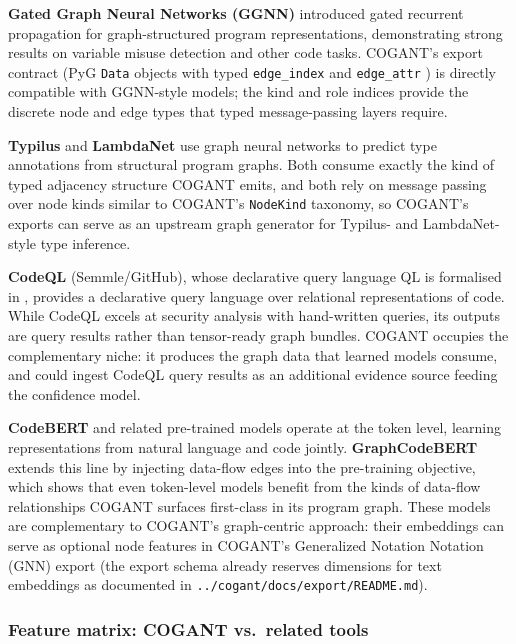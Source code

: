 \documentclass[
]{article}
\begin{document}
\textbf{Gated Graph Neural Networks (GGNN)} \citep{li2016gated}
introduced gated recurrent propagation for graph-structured program
representations, demonstrating strong results on variable misuse
detection and other code tasks. COGANT's export contract (PyG
\texttt{Data} objects with typed \texttt{edge\_index} and
\texttt{edge\_attr} \citep{fey2019pyg}) is directly compatible with
GGNN-style models; the kind and role indices provide the discrete node
and edge types that typed message-passing layers require.

\textbf{Typilus} \citep{allamanis2020typilus} and \textbf{LambdaNet}
\citep{wei2020lambdanet} use graph neural networks to predict type
annotations from structural program graphs. Both consume exactly the
kind of typed adjacency structure COGANT emits, and both rely on message
passing over node kinds similar to COGANT's \texttt{NodeKind} taxonomy,
so COGANT's exports can serve as an upstream graph generator for
Typilus- and LambdaNet-style type inference.

\textbf{CodeQL} (Semmle/GitHub), whose declarative query language QL is
formalised in \citep{avgustinov2016ql}, provides a declarative query
language over relational representations of code. While CodeQL excels at
security analysis with hand-written queries, its outputs are query
results rather than tensor-ready graph bundles. COGANT occupies the
complementary niche: it produces the graph data that learned models
consume, and could ingest CodeQL query results as an additional evidence
source feeding the confidence model.

\textbf{CodeBERT} \citep{feng2020codebert} and related pre-trained
models operate at the token level, learning representations from natural
language and code jointly. \textbf{GraphCodeBERT}
\citep{guo2021graphcodebert} extends this line by injecting data-flow
edges into the pre-training objective, which shows that even token-level
models benefit from the kinds of data-flow relationships COGANT surfaces
first-class in its program graph. These models are complementary to
COGANT's graph-centric approach: their embeddings can serve as optional
node features in COGANT's Generalized Notation Notation (GNN) export
(the export schema already reserves dimensions for text embeddings as
documented in \texttt{../cogant/docs/export/README.md}).

\subsubsection{Feature matrix: COGANT vs.~related
tools}\label{feature-matrix-cogant-vs.-related-tools}
\end{document}
